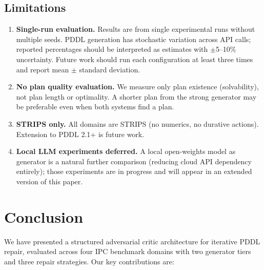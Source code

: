\documentclass{article}
\begin{document}
\subsection{Limitations}
\label{sec:limitations}

\begin{enumerate}[leftmargin=1.5em]
  \item \textbf{Single-run evaluation.}
        Results are from single experimental runs without multiple seeds.  PDDL generation has
        stochastic variation across API calls; reported percentages should be interpreted as
        estimates with $\pm$5--10\% uncertainty.  Future work should run each configuration
        at least three times and report mean $\pm$ standard deviation.

  \item \textbf{No plan quality evaluation.}
        We measure only plan existence (solvability), not plan length or optimality.
        A shorter plan from the strong generator may be preferable even when both
        systems find a plan.

  \item \textbf{STRIPS only.}
        All domains are STRIPS (no numerics, no durative actions).  Extension to
        PDDL 2.1+ is future work.

  \item \textbf{Local LLM experiments deferred.}
        A local open-weights model as generator is a natural further comparison
        (reducing cloud API dependency entirely); those experiments are in progress
        and will appear in an extended version of this paper.
\end{enumerate}

\section{Conclusion}
\label{sec:conclusion}

We have presented a structured adversarial critic architecture for iterative PDDL
repair, evaluated across four IPC benchmark domains with two generator tiers and
three repair strategies.  Our key contributions are:
\end{document}
